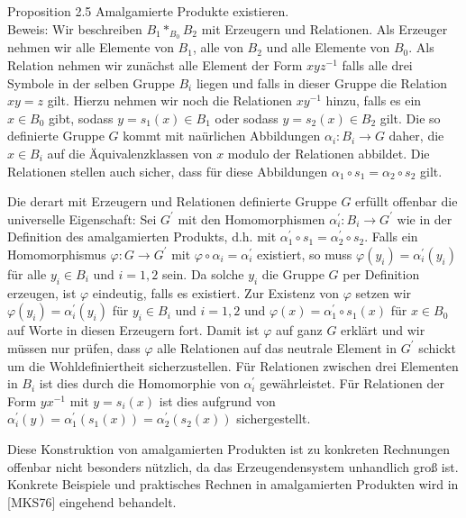 \documentclass[10pt, letterpaper]{article}
\begin{document}
Proposition 2.5 Amalgamierte Produkte existieren.\\
Beweis: Wir beschreiben $B_{1} *_{B_{0}} B_{2}$ mit Erzeugern und Relationen. Als Erzeuger nehmen wir alle Elemente von $B_{1}$, alle von $B_{2}$ und alle Elemente von $B_{0}$. Als Relation nehmen wir zunächst alle Element der Form $x y z^{-1}$ falls alle drei Symbole in der selben Gruppe $B_{i}$ liegen und falls in dieser Gruppe die Relation $x y=z$ gilt. Hierzu nehmen wir noch die Relationen $x y^{-1}$ hinzu, falls es ein $x \in B_{0}$ gibt, sodass $y=s_{1}(x) \in B_{1}$ oder sodass $y=s_{2}(x) \in B_{2}$ gilt. Die so definierte Gruppe $G$ kommt mit naürlichen Abbildungen $\alpha_{i}: B_{i} \rightarrow G$ daher, die $x \in B_{i}$ auf die Äquivalenzklassen von $x$ modulo der Relationen abbildet. Die Relationen stellen auch sicher, dass für diese Abbildungen $\alpha_{1} \circ s_{1}=\alpha_{2} \circ s_{2}$ gilt.

Die derart mit Erzeugern und Relationen definierte Gruppe $G$ erfüllt offenbar die universelle Eigenschaft: Sei $G^{\prime}$ mit den Homomorphismen $\alpha_{i}^{\prime}: B_{i} \rightarrow G^{\prime}$ wie in der Definition des amalgamierten Produkts, d.h. mit $\alpha_{1}^{\prime} \circ s_{1}=\alpha_{2}^{\prime} \circ s_{2}$. Falls ein Homomorphismus $\varphi: G \rightarrow G^{\prime}$ mit $\varphi \circ \alpha_{i}=\alpha_{i}^{\prime}$ existiert, so muss $\varphi\left(y_{i}\right)=\alpha_{i}^{\prime}\left(y_{i}\right)$ für alle $y_{i} \in B_{i}$ und $i=1,2$ sein. Da solche $y_{i}$ die Gruppe $G$ per Definition erzeugen, ist $\varphi$ eindeutig, falls es existiert. Zur Existenz von $\varphi$ setzen wir $\varphi\left(y_{i}\right)=\alpha_{i}^{\prime}\left(y_{i}\right)$ für $y_{i} \in B_{i}$ und $i=1,2$ und $\varphi(x)=\alpha_{1}^{\prime} \circ s_{1}(x)$ für $x \in B_{0}$ auf Worte in diesen Erzeugern fort. Damit ist $\varphi$ auf ganz $G$ erklärt und wir müssen nur prüfen, dass $\varphi$ alle Relationen auf das neutrale Element in $G^{\prime}$ schickt um die Wohldefiniertheit sicherzustellen. Für Relationen zwischen drei Elementen in $B_{i}$ ist dies durch die Homomorphie von $\alpha_{i}^{\prime}$ gewährleistet. Für Relationen der Form $y x^{-1}$ mit $y=s_{i}(x)$ ist dies aufgrund von $\alpha_{i}^{\prime}(y)=\alpha_{1}^{\prime}\left(s_{1}(x)\right)=\alpha_{2}^{\prime}\left(s_{2}(x)\right)$ sichergestellt.

Diese Konstruktion von amalgamierten Produkten ist zu konkreten Rechnungen offenbar nicht besonders nützlich, da das Erzeugendensystem unhandlich groß ist. Konkrete Beispiele und praktisches Rechnen in amalgamierten Produkten wird in [MKS76] eingehend behandelt.
\end{document}
